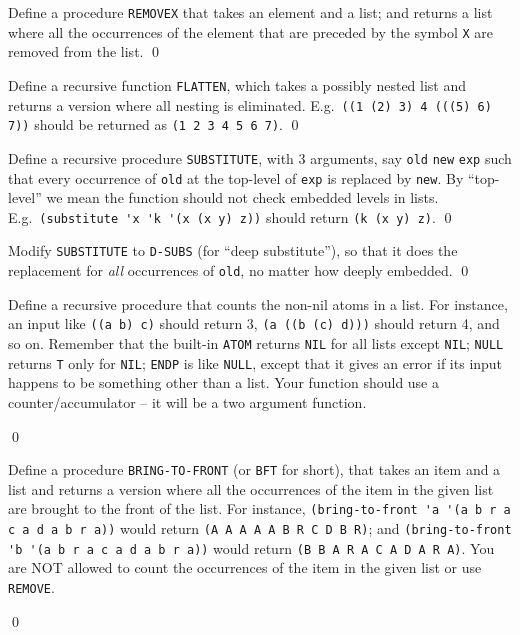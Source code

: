\documentclass[a4paper,11pt]{article}
\begin{document}
\begin{uexercise}

Define a procedure \Verb+REMOVEX+  that takes an element and a list; and returns a list where all the occurrences of the element that are preceded by the symbol \Verb+X+ are removed from the list.
\qed
\end{uexercise}

\begin{uexercise}

Define a recursive function \Verb+FLATTEN+, which takes a possibly nested list and returns a version where all nesting is eliminated. E.g.\ \Verb+((1 (2) 3) 4 (((5) 6) 7))+ should be returned as \Verb+(1 2 3 4 5 6 7)+. 
\qed
\end{uexercise}

\begin{uexercise}

Define a recursive  procedure \Verb+SUBSTITUTE+, with 3 arguments, say \Verb+old+ \Verb+new+ \Verb+exp+ such that every occurrence of \Verb+old+ at the top-level of \Verb+exp+ is replaced by \Verb+new+. By ``top-level'' we mean the function should not check embedded levels in lists. E.g.\ \Verb+(substitute 'x 'k '(x (x y) z))+ should return \Verb+(k (x y) z)+.
\qed
\end{uexercise}

\begin{uexercise}

Modify \Verb+SUBSTITUTE+ to \Verb+D-SUBS+ (for ``deep substitute''), so that it does the replacement for \emph{all} occurrences of \Verb+old+, no matter how deeply embedded.
\qed
\end{uexercise}

\begin{uexercise}

Define a recursive procedure that counts the non-nil atoms  in a list. For instance, an input like \Verb+((a b) c)+ should return 3, \Verb+(a ((b (c) d)))+ should return 4, and so on. Remember that the  built-in \Verb+ATOM+ returns \Verb+NIL+ for all lists except \Verb+NIL+; \Verb+NULL+ returns \Verb+T+ only for \Verb+NIL+; \Verb+ENDP+ is like \Verb+NULL+, except that it gives an error if its input happens to be something other than a list. Your function should use a counter/accumulator -- it will be a two argument function.

\qed
\end{uexercise}

\begin{uexercise}
Define a procedure \Verb+BRING-TO-FRONT+ (or \Verb+BFT+ for short), that takes an item and a list and returns a version where all the occurrences of the item in the given list are brought to the front of the list. For instance, 
\Verb+(bring-to-front 'a '(a b r a c a d a b r a))+ would return \Verb+(A A A A A B R C D B R)+; and \Verb+(bring-to-front 'b '(a b r a c a d a b r a))+ would return \Verb+(B B A R A C A D A R A)+. You are NOT allowed to count the occurrences of the item in the given list or use \Verb+REMOVE+.

\qed
\end{uexercise}
\end{document}
